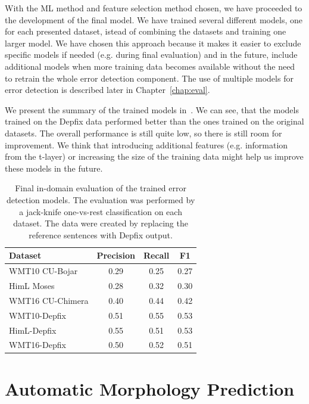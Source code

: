 With the ML method and feature selection method chosen, we have proceeded to 
the development of the final model.
We have trained several different models, one for each presented dataset, istead of combining
the datasets and training one larger model. We have chosen this approach because it makes
it easier to exclude specific models if needed (e.g. during final evaluation) and in the
future, include additional models when more training data becomes available without the need
to retrain the whole error detection component. The use of multiple models for error detection
is described later in Chapter~\ref{chap:eval}.

We present the summary of the trained models in~. We can see, that the models
trained on the Depfix data performed better than the ones trained on the original datasets. The overall
performance is still quite low, so there is still room for improvement. We think that introducing
additional features (e.g. information from the t-layer) or increasing the size of the training data
might help us improve these models in the future.

\begin{table}[t]
\centering
\small

\begin{tabular}{l|ccc}
Dataset  &  Precision  &  Recall  &  F1  \\
\hline
WMT10 CU-Bojar  &  0.29  &  0.25  &  0.27  \\
HimL Moses  &  0.28  &  0.32  &  0.30  \\
WMT16 CU-Chimera  &  0.40  &  0.44  &  0.42  \\
WMT10-Depfix  &  0.51  &  0.55  &  0.53  \\
HimL-Depfix  &  0.55  &  0.51  &  0.53  \\
WMT16-Depfix  &  0.50  &  0.52  &  0.51  \\
\end{tabular}
\caption{
    Final in-domain evaluation of the trained error detection models. The evaluation was performed
by a jack-knife one-vs-rest classification on each dataset. The  data were created
by replacing the reference sentences with Depfix output.
}
\label{wf-summary}
\end{table}


\section{Automatic Morphology Prediction}

